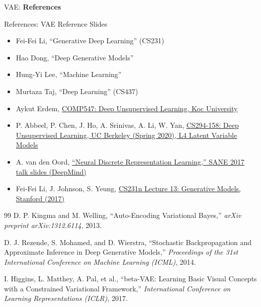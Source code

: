 \begin{frame}{}
	\LARGE VAE: \textbf{References}
\end{frame}

\begin{frame}[allowframebreaks]{References: VAE}
    Reference Slides
\begin{itemize}
    \item Fei-Fei Li, ``Generative Deep Learning'' (CS231)
    \item Hao Dong, ``Deep Generative Models''
    \item Hung-Yi Lee, ``Machine Learning''
    \item Murtaza Taj, ``Deep Learning'' (CS437)
    \item Aykut Erdem, \href{https://aykuterdem.github.io/classes/comp547.s24/}{COMP547: Deep Unsupervised Learning, Koc University}
    \item P. Abbeel, P. Chen, J. Ho, A. Srinivas, A. Li, W. Yan, \href{https://sites.google.com/view/berkeley-cs294-158-sp20/home}{CS294-158: Deep Unsupervised Learning, UC Berkeley (Spring 2020), L4 Latent Variable Models}
    \item A. van den Oord, \href{https://avdnoord.github.io/homepage/slides/SANE2017.pdf}{``Neural Discrete Representation Learning,'' SANE 2017 talk slides (DeepMind)}
    \item Fei-Fei Li, J. Johnson, S. Yeung, \href{http://cs231n.stanford.edu/slides/2017/cs231n_2017_lecture13.pdf}{CS231n Lecture 13: Generative Models, Stanford (2017)}

\end{itemize}

\framebreak
    \begin{thebibliography}{99}
        D. P. Kingma and M. Welling,
        \newblock ``Auto-Encoding Variational Bayes,''
        \newblock \emph{arXiv preprint arXiv:1312.6114}, 2013.

        D. J. Rezende, S. Mohamed, and D. Wierstra,
        \newblock ``Stochastic Backpropagation and Approximate Inference in Deep Generative Models,''
        \newblock \emph{Proceedings of the 31st International Conference on Machine Learning (ICML)}, 2014.

        I. Higgins, L. Matthey, A. Pal, et al.,
        \newblock ``beta-VAE: Learning Basic Visual Concepts with a Constrained Variational Framework,''
        \newblock \emph{International Conference on Learning Representations (ICLR)}, 2017.


\end{thebibliography}
\end{frame}
